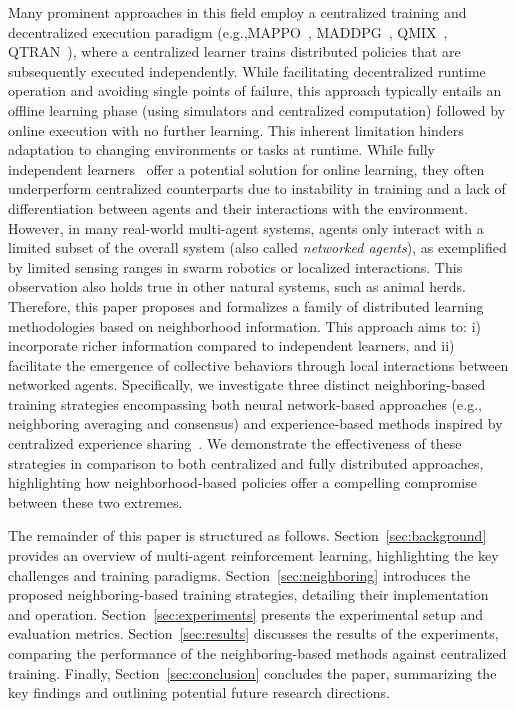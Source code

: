 \documentclass[sigconf]{acmart}
\begin{document}
\sloppy
Many prominent approaches in this field employ a centralized training and decentralized execution paradigm
 (e.g.,MAPPO~\cite{yu2022surprising}, MADDPG~\cite{DBLP:conf/nips/LoweWTHAM17}, QMIX~\cite{DBLP:conf/icml/RashidSWFFW18}, QTRAN~\cite{DBLP:conf/icml/SonKKHY19}), 
 where a centralized learner trains distributed policies that are subsequently executed independently. 
 While facilitating decentralized runtime operation and avoiding single points of failure, 
 this approach typically entails an offline learning phase (using simulators and centralized computation) 
 followed by online execution with no further learning. 
 This inherent limitation hinders adaptation to changing environments or tasks at runtime.  
% 
While fully independent learners~\cite{abed2016comparison} offer a potential solution for online learning,
 they often underperform centralized counterparts due to instability in training and a lack of differentiation between agents and their interactions with the environment. 
%
However, in many real-world multi-agent systems, 
 agents only interact with a limited subset of the overall system (also called \emph{networked agents}),
 as exemplified by limited sensing ranges in swarm robotics or localized interactions.  
 This observation also holds true in other natural systems, such as animal herds.
%
Therefore, 
this paper proposes and formalizes a family of distributed learning methodologies based on neighborhood information.
This approach aims to: 
i) incorporate richer information compared to independent learners, and
ii) facilitate the emergence of collective behaviors through local interactions between networked agents.
Specifically, we investigate three distinct neighboring-based training strategies encompassing both neural network-based approaches 
(e.g., neighboring averaging and consensus) 
and experience-based methods inspired by centralized experience sharing~\cite{DBLP:conf/nips/ChristianosSA20}. 
We demonstrate the effectiveness of these strategies in comparison to both centralized and fully distributed approaches, 
highlighting how neighborhood-based policies offer a compelling compromise between these two extremes.

The remainder of this paper is structured as follows.
Section~\ref{sec:background} provides an overview of multi-agent reinforcement learning,
highlighting the key challenges and training paradigms.
Section~\ref{sec:neighboring} introduces the proposed neighboring-based training strategies,
detailing their implementation and operation.
Section~\ref{sec:experiments} presents the experimental setup and evaluation metrics.
Section~\ref{sec:results} discusses the results of the experiments,
comparing the performance of the neighboring-based methods against centralized training.
Finally, Section~\ref{sec:conclusion} concludes the paper,
summarizing the key findings and outlining potential future research directions.
\end{document}
